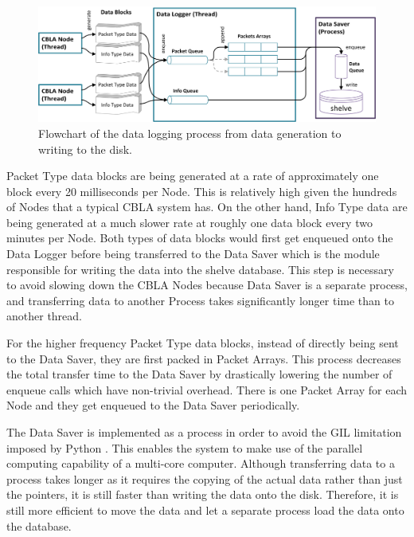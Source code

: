 \begin{figure}[!htbp]
	\centering
	\includegraphics[width=1.0 \textwidth]{"fig/interactive control system/DataLogger process"}
	\caption[Flowchart of the data logging process]{Flowchart of the data logging process from data generation to writing to the disk.}
	\label{fig:DataLogger process}
\end{figure}

Packet Type data blocks are being generated at a rate of approximately one block every 20 milliseconds per Node. This is relatively high given the hundreds of Nodes that a typical CBLA system has. On the other hand, Info Type data are being generated at a much slower rate at roughly one data block every two minutes per Node. Both types of data blocks would first get enqueued onto the Data Logger before being transferred to the Data Saver which is the module responsible for writing the data into the shelve database. This step is necessary to avoid slowing down the CBLA Nodes because Data Saver is a separate process, and transferring data to another Process takes significantly longer time than to another thread. 

For the higher frequency Packet Type data blocks, instead of directly being sent to the Data Saver, they are first packed in Packet Arrays. This process decreases the total transfer time to the Data Saver by drastically lowering the number of enqueue calls which have non-trivial overhead. There is one Packet Array for each Node and they get enqueued to the Data Saver periodically. 

The Data Saver is implemented as a process in order to avoid the GIL limitation imposed by Python \cite{Beazley2010}. This enables the system to make use of the parallel computing capability of a multi-core computer. Although transferring data to a process takes longer as it requires the copying of the actual data rather than just the pointers, it is still faster than writing the data onto the disk. Therefore, it is still more efficient to move the data and let a separate process load the data onto the database.

